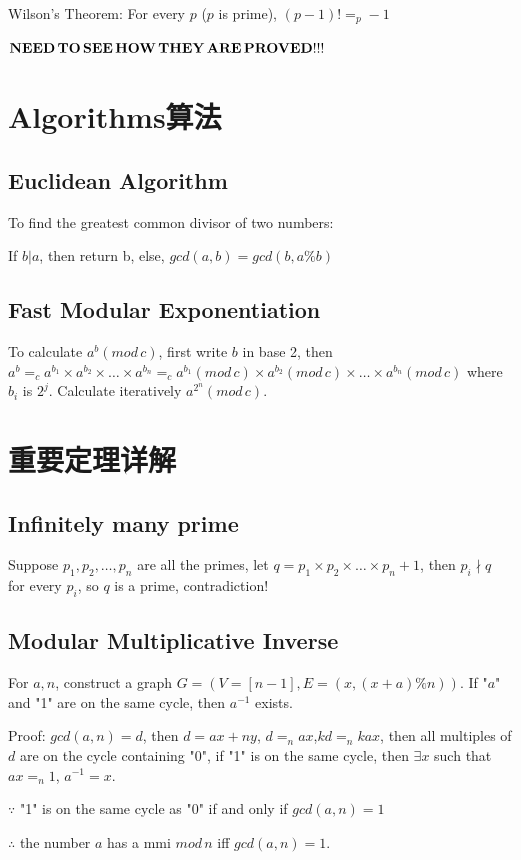 \documentclass[12pt,a4paper]{ctexrep}
\begin{document}
Wilson's Theorem:
For every $p$ ($p$ is prime), $(p-1)! =_p -1$

$\bold{NEED\, TO\, SEE\, HOW\, THEY\, ARE\, PROVED!!!}$

\section{Algorithms算法}
\subsection{Euclidean Algorithm}
To find the greatest common divisor of two numbers:

If $b|a$, then return b, else, $gcd(a,b) = gcd(b,a\%b)$
\subsection{Fast Modular Exponentiation}
To calculate $a^b (mod\, c)$, first write $b$ in base 2, then $a^b =_c a^{b_1} \times a^{b_2} \times \dots \times a^{b_n} =_c a^{b_1}(mod\, c) \times a^{b_2}(mod\, c) \times  \dots \times a^{b_n}(mod\, c)$ where $b_i$ is $2^j$. Calculate iteratively $a^{2^n} (mod\, c)$.

\section{重要定理详解}
\subsection{Infinitely many prime}
Suppose $p_1,p_2,\dots,p_n$ are all the primes, let $q = p_1\times p_2\times \dots \times p_n+1$, then $p_i \nmid q$ for every $p_i$, so $q$ is a prime, contradiction!

\subsection{Modular Multiplicative Inverse} 
For $a,n$, construct a graph $G=(V=[n-1],E=(x,(x+a)\%n))$. If "$a$" and "1" are on the same cycle, then $a^{-1}$ exists.

Proof: $gcd(a,n) = d$, then $d = ax+ny$, $d =_n ax$,$kd =_n kax$, then all multiples of $d$ are on the cycle containing "0", if "1" is on the same cycle, then $\exists x$ such that $ax =_n 1$, $a^{-1} = x$.

$\because$ "1" is on the same cycle as "0" if and only if $gcd(a,n)=1$

$\therefore$ the number $a$ has a mmi $mod\, n$ iff $gcd(a,n)=1$.
\end{document}
